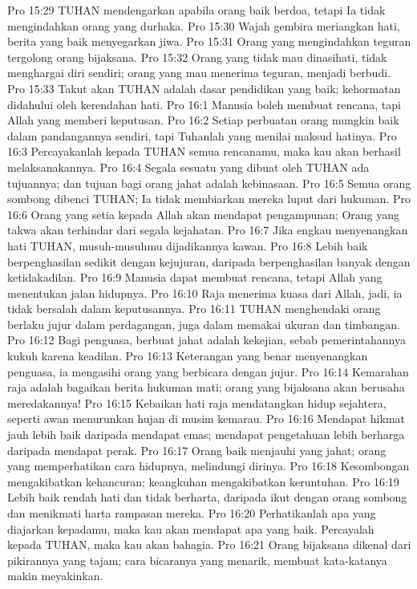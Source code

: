 Pro 15:29  TUHAN mendengarkan apabila orang baik berdoa, tetapi Ia tidak mengindahkan orang yang durhaka.
Pro 15:30  Wajah gembira meriangkan hati, berita yang baik menyegarkan jiwa.
Pro 15:31  Orang yang mengindahkan teguran tergolong orang bijaksana.
Pro 15:32  Orang yang tidak mau dinasihati, tidak menghargai diri sendiri; orang yang mau menerima teguran, menjadi berbudi.
Pro 15:33  Takut akan TUHAN adalah dasar pendidikan yang baik; kehormatan didahului oleh kerendahan hati.
Pro 16:1  Manusia boleh membuat rencana, tapi Allah yang memberi keputusan.
Pro 16:2  Setiap perbuatan orang mungkin baik dalam pandangannya sendiri, tapi Tuhanlah yang menilai maksud hatinya.
Pro 16:3  Percayakanlah kepada TUHAN semua rencanamu, maka kau akan berhasil melaksanakannya.
Pro 16:4  Segala sesuatu yang dibuat oleh TUHAN ada tujuannya; dan tujuan bagi orang jahat adalah kebinasaan.
Pro 16:5  Semua orang sombong dibenci TUHAN; Ia tidak membiarkan mereka luput dari hukuman.
Pro 16:6  Orang yang setia kepada Allah akan mendapat pengampunan; Orang yang takwa akan terhindar dari segala kejahatan.
Pro 16:7  Jika engkau menyenangkan hati TUHAN, musuh-musuhmu dijadikannya kawan.
Pro 16:8  Lebih baik berpenghasilan sedikit dengan kejujuran, daripada berpenghasilan banyak dengan ketidakadilan.
Pro 16:9  Manusia dapat membuat rencana, tetapi Allah yang menentukan jalan hidupnya.
Pro 16:10  Raja menerima kuasa dari Allah, jadi, ia tidak bersalah dalam keputusannya.
Pro 16:11  TUHAN menghendaki orang berlaku jujur dalam perdagangan, juga dalam memakai ukuran dan timbangan.
Pro 16:12  Bagi penguasa, berbuat jahat adalah kekejian, sebab pemerintahannya kukuh karena keadilan.
Pro 16:13  Keterangan yang benar menyenangkan penguasa, ia mengasihi orang yang berbicara dengan jujur.
Pro 16:14  Kemarahan raja adalah bagaikan berita hukuman mati; orang yang bijaksana akan berusaha meredakannya!
Pro 16:15  Kebaikan hati raja mendatangkan hidup sejahtera, seperti awan menurunkan hujan di musim kemarau.
Pro 16:16  Mendapat hikmat jauh lebih baik daripada mendapat emas; mendapat pengetahuan lebih berharga daripada mendapat perak.
Pro 16:17  Orang baik menjauhi yang jahat; orang yang memperhatikan cara hidupnya, melindungi dirinya.
Pro 16:18  Kesombongan mengakibatkan kehancuran; keangkuhan mengakibatkan keruntuhan.
Pro 16:19  Lebih baik rendah hati dan tidak berharta, daripada ikut dengan orang sombong dan menikmati harta rampasan mereka.
Pro 16:20  Perhatikanlah apa yang diajarkan kepadamu, maka kau akan mendapat apa yang baik. Percayalah kepada TUHAN, maka kau akan bahagia.
Pro 16:21  Orang bijaksana dikenal dari pikirannya yang tajam; cara bicaranya yang menarik, membuat kata-katanya makin meyakinkan.
